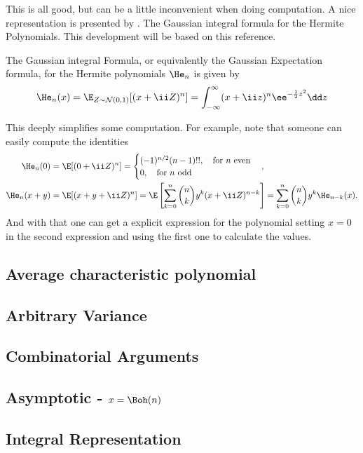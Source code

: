 This is all good, but can be a little inconvenient when doing computation. A nice representation is presented by \cite{nica2025gaussianintegralformulahermite}. The Gaussian integral formula for the Hermite Polynomials. This development will be based on this reference.
\begin{definicao}
	The Gaussian integral Formula, or equivalently the Gaussian Expectation formula, for the Hermite polynomials $\He_n$ is given by
	\begin{equation}
		\He_n(x) = \E_{Z \sim \mathcal{N}(0,1)}[(x+\ii Z)^n] = \int_{-\infty}^{\infty} (x+\ii z)^n \ee^{-\frac{1}{2} z^2} \dd z
	\end{equation}
	\label{Def: Gaussian integral-expectation formula}
\end{definicao}
This deeply simplifies some computation. For example, note that someone can easily compute the identities
\begin{align}
	\He_n(0) & = \E[(0 + \ii Z)^n] = \begin{cases}
		(-1)^{n/2}(n-1)!!, \quad \text{for $n$ even} \\
		0, \quad \text{for $n$ odd}
	\end{cases}, \\
	\He_n(x+y) & = \E[(x+y+\ii Z)^n] = \E\left[\sum_{k=0}^{n} \binom{n}{k} y^k (x+\ii Z)^{n-k}\right] = \sum_{k=0}^{n} \binom{n}{k} y^k \He_{n-k}(x).
\end{align}
And with that one can get a explicit expression for the polynomial setting $x=0$ in the second expression and using the first one to calculate the values.

\subsection{Average characteristic polynomial}



\subsection{Arbitrary Variance}



\subsection{Combinatorial Arguments} 



\subsection{Asymptotic - $x = \Boh(n)$}
\label{Subsection: Hermite x=n}



\subsection{Integral Representation}
\label{Subsection: Integral Hermite}



